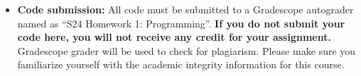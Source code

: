 \begin{itemize}
\begin{itemize}
\item \textbf{Code submission:} All code must be submitted to a Gradescope autograder named as
``S24 Homework 1: Programming''.  \textbf{If you do not submit your code here, you will not receive any credit for your assignment.} Gradescope grader will be used to check for plagiarism.  Please make sure you familiarize yourself with the academic integrity information for this course.

\end{itemize}


\end{itemize}